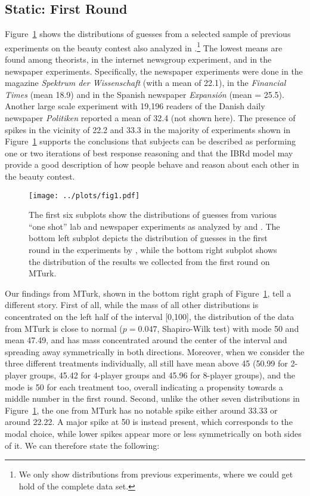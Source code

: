 \documentclass[12pt,review]{elsarticle}
\begin{document}
\subsection{Static: First Round\label{subsec:Static:-First-Round}}
\noindent
Figure~\ref{fig:1} shows the distributions of guesses from a selected sample of previous experiments on the beauty contest also analyzed in \citet{NagelEtAl02}.\footnote{We only show distributions from previous experiments, where we could get hold of the complete data set.} The lowest means are found among theorists, in the internet newsgroup experiment, and in the newspaper experiments. Specifically, the newspaper experiments were done in the magazine \textit{Spektrum der Wissenschaft} \cite{selten1998zahlenwahlspiel} (with a mean of 22.1), in the \textit{Financial Times} \cite{Thaler1997competition} (mean 18.9) and in the Spanish newspaper \textit{Expansión} \cite{NagelEtAl02} (mean = 25.5). Another large scale experiment with 19,196 readers of the Danish daily newspaper \textit{Politiken} reported a mean of 32.4 \cite{schou2005gaet} (not shown here). The presence of spikes in the vicinity of 22.2 and 33.3 in the majority of experiments shown in Figure~\ref{fig:1} supports the conclusions that subjects can be described as performing one or two iterations of best response reasoning and that the IBRd model may provide a good description of how people behave and reason about each other in the beauty contest. 

\begin{figure}
\texttt{[image: ../plots/fig1.pdf]}\caption{The first six subplots show the distributions of guesses from various ``one shot'' lab and newspaper experiments as analyzed by \citet{NagelEtAl02, Thaler1997competition, selten1998zahlenwahlspiel} and \citet{bosch1997juego}. The bottom left subplot depicts the distribution of guesses in the first round in the experiments by \citet{Nagel95}, while the bottom right subplot shows the distribution of the results we collected from the first round on MTurk.}
\label{fig:1}
\end{figure}

Our findings from MTurk, shown in the bottom right graph of Figure~\ref{fig:1}, tell a different story. First of all, while the mass of all other distributions is concentrated on the left half of the interval {[}0,100{]}, the distribution of the data from MTurk is close to normal ($p=0.047$, Shapiro-Wilk test) with mode 50 and mean 47.49, and has mass concentrated around the center of the interval and spreading away symmetrically in both directions. Moreover, when we consider the three different treatments individually, all still have mean above 45 (50.99 for 2-player groups, 45.42 for 4-player groups and 45.96 for 8-player groups), and the mode is 50 for each treatment too, overall indicating a propensity towards a middle number in the first round. Second, unlike the other seven distributions in Figure~\ref{fig:1}, the one from MTurk has no notable spike either around 33.33 or around 22.22. A major spike at 50 is instead present, which corresponds to the modal choice, while lower spikes appear more or less symmetrically on both sides of it. We can therefore state the following:
\end{document}
